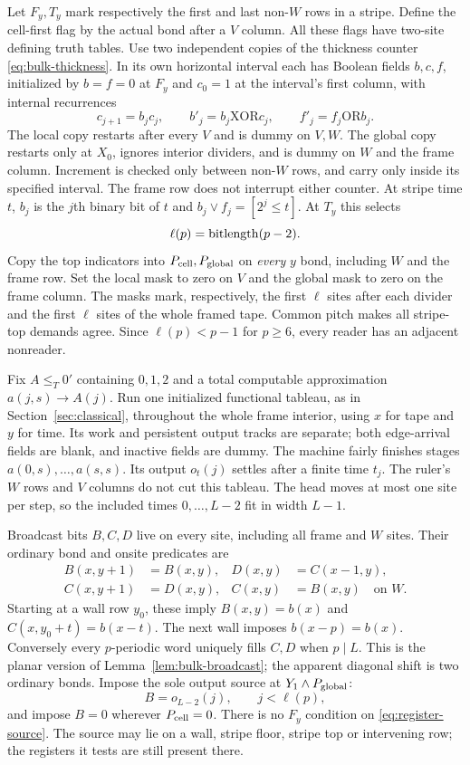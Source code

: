 Let $F_y,T_y$ mark respectively the first and last non-$W$ rows in
a stripe. Define the cell-first flag by the actual bond after a $V$
column. All these flags have two-site defining truth tables.
Use two independent copies of the thickness counter
\eqref{eq:bulk-thickness}. In its own horizontal interval each has
Boolean fields $b,c,f$, initialized by $b=f=0$ at $F_y$ and $c_0=1$
at the interval's first column, with internal recurrences
\[
 c_{j+1}=b_jc_j,\qquad b'_j=b_j\mathbin{\mathrm{XOR}}c_j,
 \qquad f'_j=f_j\mathbin{\mathrm{OR}}b_j.
\]
The local copy restarts after every $V$ and is dummy on $V,W$.
The global copy restarts only at $X_0$, ignores interior dividers,
and is dummy on $W$ and the frame column. Increment is checked only
between non-$W$ rows, and carry only inside its specified interval.
The frame row does not interrupt either counter.
At stripe time $t$, $b_j$ is the $j$th binary bit of $t$ and
$b_j\lor f_j=[2^j\leq t]$. At $T_y$ this selects
\[
 \ell(p)=\operatorname{bitlength}(p-2).
\]
Copy the top indicators into $P_{\rm cell},P_{\rm global}$ on
\emph{every} $y$ bond, including $W$ and the frame row. Set the local
mask to zero on $V$ and the global mask to zero on the frame column.
The masks mark, respectively, the first $\ell$ sites after each
divider and the first $\ell$ sites of the whole framed tape.
Common pitch makes all stripe-top demands agree. Since
$\ell(p)<p-1$ for $p\geq6$, every reader has an adjacent nonreader.

Fix $A\leq_T0'$ containing $0,1,2$ and a total computable
approximation $a(j,s)\to A(j)$. Run one initialized functional
tableau, as in Section~\ref{sec:classical}, throughout the whole frame
interior, using $x$ for tape and $y$ for time. Its work and persistent
output tracks are separate; both edge-arrival fields are blank,
and inactive fields are dummy. The machine fairly finishes stages
$a(0,s),\ldots,a(s,s)$. Its output $o_t(j)$ settles after a finite
time $t_j$. The ruler's $W$ rows and $V$ columns do not cut this
tableau. The head moves at most one site per step, so the included
times $0,\ldots,L-2$ fit in width $L-1$.

Broadcast bits $B,C,D$ live on every site, including all frame and
$W$ sites. Their ordinary bond and onsite predicates are
\begin{align*}
 B(x,y+1)&=B(x,y),&D(x,y)&=C(x-1,y),\\
 C(x,y+1)&=D(x,y),&C(x,y)&=B(x,y)\quad\text{on }W.
\end{align*}
Starting at a wall row $y_0$, these imply
$B(x,y)=b(x)$ and $C(x,y_0+t)=b(x-t)$. The next wall imposes
$b(x-p)=b(x)$. Conversely every $p$-periodic word uniquely fills
$C,D$ when $p\mid L$. This is the planar version of
Lemma~\ref{lem:bulk-broadcast}; the apparent diagonal shift is two
ordinary bonds.
Impose the sole output source at $Y_1\wedge P_{\rm global}$:
\begin{equation}\label{eq:register-source}
 B=o_{L-2}(j),\qquad j<\ell(p),
\end{equation}
and impose $B=0$ wherever $P_{\rm cell}=0$.
There is no $F_y$ condition on \eqref{eq:register-source}.
The source may lie on a wall, stripe floor, stripe top or intervening
row; the registers it tests are still present there.

